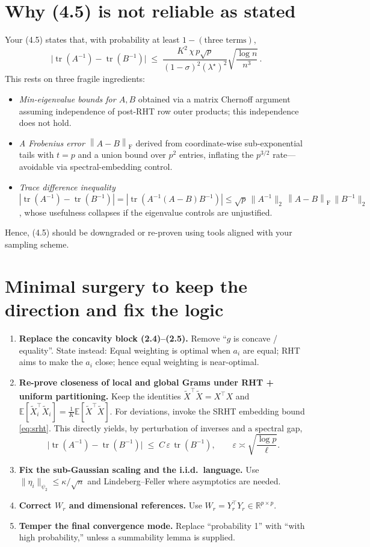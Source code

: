 \documentclass[11pt]{article}
\newcommand{\tr}{\operatorname{tr}}
\newcommand{\frnorm}[1]{\left\lVert #1 \right\rVert_{\mathrm{F}}}
\newcommand{\E}{\mathbb{E}}
\newcommand{\eps}{\varepsilon}
\newcommand{\R}{\mathbb{R}}
\theoremstyle{plain}
\begin{document}
\section{Why (4.5) is not reliable as stated}
Your (4.5) states that, with probability at least \(1-(\text{three terms})\),
\[
\big|\tr(A^{-1})-\tr(B^{-1})\big| \;\le\;
\frac{K^2\,\chi\,p\sqrt{p}}{(1-\sigma)^2(\lambda^\star)^2}\sqrt{\frac{\log n}{n^3}}\,.
\]
This rests on three fragile ingredients:
\begin{itemize}[leftmargin=*]
\item \emph{Min-eigenvalue bounds for \(A,B\)} obtained via a matrix Chernoff argument assuming independence of post-RHT row outer products; this independence does not hold.
\item \emph{A Frobenius error \(\frnorm{A-B}\)} derived from coordinate-wise sub-exponential tails with \(t=p\) and a union bound over \(p^2\) entries, inflating the \(p^{3/2}\) rate---avoidable via spectral-embedding control.
\item \emph{Trace difference inequality} \( |\tr(A^{-1})-\tr(B^{-1})|=|\tr(A^{-1}(A-B)B^{-1})| \le \sqrt{p}\,\|A^{-1}\|_2\,\frnorm{A-B}\,\|B^{-1}\|_2 \),
whose usefulness collapses if the eigenvalue controls are unjustified.
\end{itemize}
Hence, (4.5) should be downgraded or re-proven using tools aligned with your sampling scheme.

\section{Minimal surgery to keep the direction and fix the logic}
\begin{enumerate}[leftmargin=*,label=\textbf{(\Alph*)}]
\item \textbf{Replace the concavity block (2.4)--(2.5).} Remove ``\(g\) is concave / equality''. State instead: Equal weighting is optimal when \(a_i\) are equal; RHT aims to make the \(a_i\) close; hence equal weighting is near-optimal.
\item \textbf{Re-prove closeness of local and global Grams under RHT + uniform partitioning.}
Keep the identities \(\tilde X^\top \tilde X=X^\top X\) and \(\E[\tilde X_i^\top \tilde X_i]=\frac{1}{K}\E[\tilde X^\top \tilde X]\).
For deviations, invoke the SRHT embedding bound \eqref{eq:srht}. This directly yields, by perturbation of inverses and a spectral gap,
\[
\big|\tr(A^{-1})-\tr(B^{-1})\big| \;\le\; C\,\eps\,\tr(B^{-1}),\qquad
\eps \asymp \sqrt{\frac{\log p}{\ell}}.
\]
\item \textbf{Fix the sub-Gaussian scaling and the i.i.d.\ language.} Use \(\|\eta_i\|_{\psi_2}\le \kappa/\sqrt{n}\) and Lindeberg--Feller where asymptotics are needed.
\item \textbf{Correct \(W_r\) and dimensional references.} Use \(W_r=Y_r^\top Y_r\in\R^{p\times p}\).
\item \textbf{Temper the final convergence mode.} Replace ``probability 1'' with ``with high probability,'' unless a summability lemma is supplied.
\end{enumerate}
\end{document}
